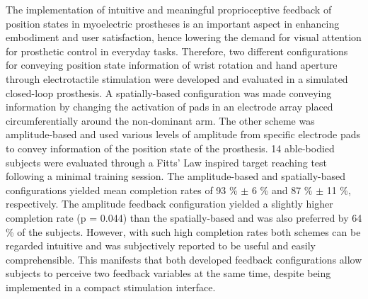 The implementation of intuitive and meaningful proprioceptive feedback of position states in myoelectric prostheses is an important aspect in enhancing embodiment and user satisfaction, hence lowering the demand for visual attention for prosthetic control in everyday tasks. Therefore, two different configurations for conveying position state information of wrist rotation and hand aperture through electrotactile stimulation were developed and evaluated in a simulated closed-loop prosthesis. A spatially-based configuration was made conveying information by changing the activation of pads in an electrode array placed circumferentially around the non-dominant arm. The other scheme was amplitude-based and used various levels of amplitude from specific electrode pads to convey information of the position state of the prosthesis. 14 able-bodied subjects were evaluated through a Fitts' Law inspired target reaching test following a minimal training session.
The amplitude-based and spatially-based configurations yielded mean completion rates of 93 \% $\boldsymbol{\pm}$ 6 \% and 87 \% $\boldsymbol{\pm}$ 11 \%, respectively. The amplitude feedback configuration yielded a slightly higher completion rate (p = 0.044) than the spatially-based and was also preferred by 64 \% of the subjects. However, with such high completion rates both schemes can be regarded intuitive and was subjectively reported to be useful and easily comprehensible. This manifests that both developed feedback configurations allow subjects to perceive two feedback variables at the same time, despite being implemented in a compact stimulation interface. 
